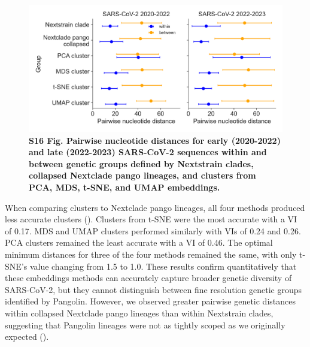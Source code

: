 \documentclass[10pt,letterpaper]{article}
\begin{document}
\begin{figure}[!h]
\includegraphics[width=\columnwidth]{figures/within_between_sars.png}
\caption*{{\bf S16 Fig. Pairwise nucleotide distances for early (2020-2022) and late (2022-2023) SARS-CoV-2 sequences within and between genetic groups defined by Nextstrain clades, collapsed Nextclade pango lineages, and clusters from PCA, MDS, t-SNE, and UMAP embeddings.}}
\end{figure}

When comparing clusters to Nextclade pango lineages, all four methods produced less accurate clusters ().
Clusters from t-SNE were the most accurate with a VI of 0.17.
MDS and UMAP clusters performed similarly with VIs of 0.24 and 0.26.
PCA clusters remained the least accurate with a VI of 0.46.
The optimal minimum distances for three of the four methods remained the same, with only t-SNE's value changing from 1.5 to 1.0.
These results confirm quantitatively that these embeddings methods can accurately capture broader genetic diversity of SARS-CoV-2, but they cannot distinguish between fine resolution genetic groups identified by Pangolin.
However, we observed greater pairwise genetic distances within collapsed Nextclade pango lineages than within Nextstrain clades, suggesting that Pangolin lineages were not as tightly scoped as we originally expected ().
\end{document}
